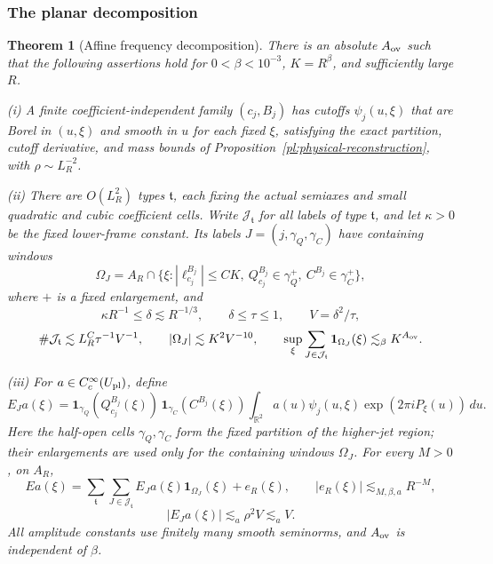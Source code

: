 \documentclass[11pt]{amsart}
\newtheorem{theorem}{Theorem}[section]
\theoremstyle{definition}
\theoremstyle{remark}
\numberwithin{equation}{section}
\begin{document}
\subsubsection{The planar decomposition}
\begin{theorem}[Affine frequency decomposition]\label{pl:packet-resolution}\label{pl:decomposition}
There is an absolute $A_{\rm ov}$ such that the following assertions hold for $0<\beta<10^{-3}$, $K=R^\beta$, and sufficiently large $R$.

\noindent\textup{(i)} A finite coefficient-independent family $(c_j,B_j)$ has cutoffs $\psi_j(u,\xi)$ that are Borel in $(u,\xi)$ and smooth in $u$ for each fixed $\xi$, satisfying the exact partition, cutoff derivative, and mass bounds of Proposition~\ref{pl:physical-reconstruction}, with $\rho\sim L_R^{-2}$.

\noindent\textup{(ii)} There are $O(L_R^2)$ types $\mathfrak t$, each fixing the actual semiaxes and small quadratic and cubic coefficient cells. Write $\mathcal J_{\mathfrak t}$ for all labels of type $\mathfrak t$, and let $\kappa>0$ be the fixed lower-frame constant. Its labels $J=(j,\gamma_Q,\gamma_C)$ have containing windows
\begin{equation}\label{pl:frequency-box}
\Omega_J=A_R\cap\{\xi:|\ell_{c_j}^{B_j}|\le CK,\ Q_{c_j}^{B_j}\in\gamma_Q^+,\ C^{B_j}\in\gamma_C^+\},
\end{equation}
where $+$ is a fixed enlargement, and
\begin{equation}\label{pl:retained-range}
\kappa R^{-1}\le\delta\lesssim R^{-1/3},\qquad \delta\le\tau\le1,\qquad V=\delta^2/\tau,
\end{equation}
\begin{equation}\label{pl:bounded-overlap}
\#\mathcal J_{\mathfrak t}\lesssim L_R^C\tau^{-1}V^{-1},\qquad |\Omega_J|\lesssim K^2V^{-10},\qquad \sup_\xi\sum_{J\in\mathcal J_{\mathfrak t}}\mathbf1_{\Omega_J}(\xi)\lesssim_\beta K^{A_{\rm ov}}.
\end{equation}

\noindent\textup{(iii)} For $a\in C_c^\infty(U_{\rm pl})$, define
\[
E_Ja(\xi)=\mathbf1_{\gamma_Q}(Q_{c_j}^{B_j}(\xi))\,\mathbf1_{\gamma_C}(C^{B_j}(\xi))\int_{\mathbb R^2}a(u)\psi_j(u,\xi)\exp(2\pi iP_\xi(u))\,du.
\]
Here the half-open cells $\gamma_Q,\gamma_C$ form the fixed partition of the higher-jet region; their enlargements are used only for the containing windows $\Omega_J$. For every $M>0$, on $A_R$,
\begin{equation}\label{pl:packet-decomposition}
Ea(\xi)=\sum_{\mathfrak t}\sum_{J\in\mathcal J_{\mathfrak t}}E_Ja(\xi)\mathbf1_{\Omega_J}(\xi)+e_R(\xi),\qquad |e_R(\xi)|\lesssim_{M,\beta,a} R^{-M},
\end{equation}
\begin{equation}\label{pl:packet-trivial}
|E_Ja(\xi)|\lesssim_a\rho^2V\lesssim_a V.
\end{equation}
All amplitude constants use finitely many smooth seminorms, and $A_{\rm ov}$ is independent of $\beta$.
\end{theorem}
\end{document}
